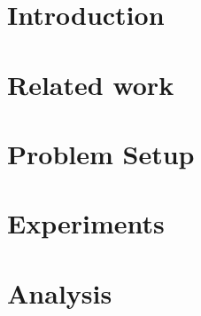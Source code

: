 \documentclass[letterpaper]{article}
\begin{document}
\begin{abstract}
\begin{quote}






\end{quote}
\end{abstract}

\section{Introduction}
\label{intro}


\section{Related work}
\label{related-work}


\section{Problem Setup}
\label{problem}


\section{Experiments}
\label{experiments}


\section{Analysis}
\label{analysis}












 

\end{document}
